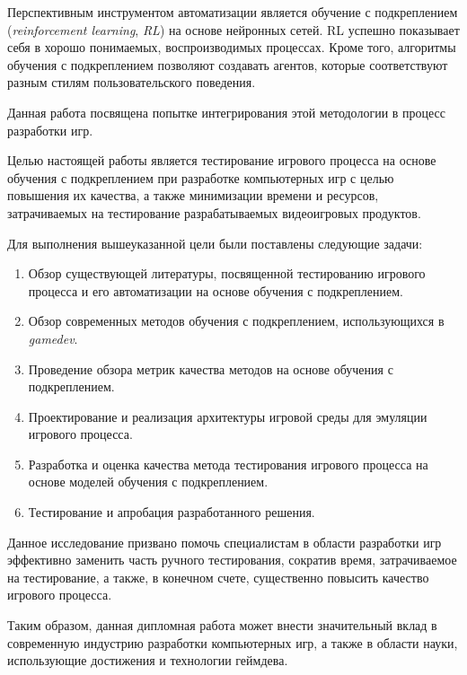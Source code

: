 Перспективным инструментом автоматизации является обучение с подкреплением (\textit{reinforcement learning}, \textit{RL}) на основе нейронных сетей. RL успешно показывает себя в хорошо понимаемых, воспроизводимых процессах. Кроме того, алгоритмы обучения с подкреплением позволяют создавать агентов, которые соответствуют разным стилям пользовательского поведения.

Данная работа посвящена попытке интегрирования этой методологии в процесс разработки игр.

Целью настоящей работы является тестирование игрового процесса на основе обучения с подкреплением при разработке компьютерных игр с целью повышения их качества, а также минимизации времени и ресурсов, затрачиваемых на тестирование разрабатываемых видеоигровых продуктов.

Для выполнения вышеуказанной цели были поставлены следующие задачи:
\begin{enumerate}
	\item Обзор существующей литературы, посвященной тестированию игрового процесса и его автоматизации на основе обучения с подкреплением.
	\item Обзор современных методов обучения с подкреплением, использующихся в \textit{gamedev}.
	\item Проведение обзора метрик качества методов на основе обучения с подкреплением.
	\item Проектирование и реализация архитектуры игровой среды для эмуляции игрового процесса.
	\item Разработка и оценка качества метода тестирования игрового процесса на основе моделей обучения с подкреплением.
	\item Тестирование и апробация разработанного решения.
\end{enumerate}

Данное исследование призвано помочь специалистам в области разработки игр эффективно заменить часть ручного тестирования, сократив время, затрачиваемое на тестирование, а также, в конечном счете, существенно повысить качество игрового процесса.

Таким образом, данная дипломная работа может внести значительный вклад в современную индустрию разработки компьютерных игр, а также в области науки, использующие достижения и технологии геймдева.

%



